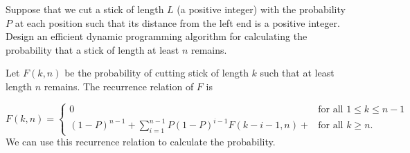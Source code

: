 \begin{Exercise}[origin={NCNU CSIE 93}]
Suppose that we cut a stick of length $L$ (a positive integer) with the probability $P$ at each position such that its distance from the left end is a positive integer.
Design an efficient dynamic programming algorithm for calculating the probability that a stick of length at least $n$ remains.
\end{Exercise}
\begin{Answer}
Let $F(k, n)$ be the probability of cutting stick of length $k$ such that at least length $n$ remains. The recurrence relation of $F$ is 

\[ F(k, n) = 
   \begin{cases}
       0 & \text{for all } 1 \leq k \leq n-1 \\ 
       (1-P)^{n-1} + \sum_{i=1}^{n-1} P(1-P)^{i-1}F(k-i-1, n) +  & \text{for all } k \geq n.
    \end{cases} \]
We can use this recurrence relation to calculate the probability.    
\end{Answer}
\printbibliography[heading=subbibliography]
